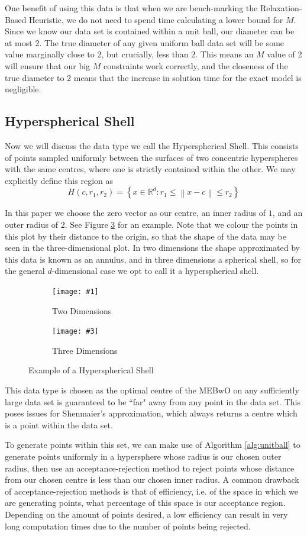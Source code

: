 \documentclass[11pt,twoside]{report}
\newcommand{\norm}[1]{\left\lVert#1\right\rVert} %
\newcommand{\pairfigure}[6]{
    \begin{figure}[ht]
        \centering
        \begin{subfigure}[b]{0.475\textwidth}
            \centering
            \texttt{[image: \#1]}
            \caption{#2}
            \label{#6_#2}
        \end{subfigure}
        \hfill
        \begin{subfigure}[b]{0.475\textwidth}
            \centering
            \texttt{[image: \#3]}
            \caption{#4}
            \label{#6_#4}
        \end{subfigure}
        \caption{#5}
        \label{#6}
\end{figure}
}
\newcommand{\datafigure}[3]{
    \pairfigure{data_plots/#1_2d.png}{Two Dimensions}{data_plots/#1_3d.png}{Three Dimensions}{#2}{#3}
}
\theoremstyle{definition}
\numberwithin{theorem}{section}
\numberwithin{definition}{section}
\numberwithin{lemma}{section}
\numberwithin{proposition}{section}
\numberwithin{equation}{section}
\numberwithin{figure}{section}
\begin{document}
One benefit of using this data is that when we are bench-marking the Relaxation-Based Heuristic, we do not need to spend time calculating a lower bound for $M$. Since we know our data set is contained within a unit ball, our diameter can be at most 2. The true diameter of any given uniform ball data set will be some value marginally close to 2, but crucially, less than 2. This means an $M$ value of 2 will ensure that our big $M$ constraints work correctly, and the closeness of the true diameter to 2 means that the increase in solution time for the exact model is negligible.

\subsection{Hyperspherical Shell}
Now we will discuss the data type we call the Hyperspherical Shell. This consists of points sampled uniformly between the surfaces of two concentric hyperspheres with the same centres, where one is strictly contained within the other. We may explicitly define this region as
\begin{equation*}
    H(c,r_1,r_2) = \left\{x\in\mathbb{R}^d: r_1 \leq \norm{x-c} \leq r_2\right\}
\end{equation*}

In this paper we choose the zero vector as our centre, an inner radius of $1$, and an outer radius of $2$. See Figure \ref{fig:hypshell} for an example. Note that we colour the points in this plot by their distance to the origin, so that the shape of the data may be seen in the three-dimensional plot. In two dimensions the shape approximated by this data is known as an annulus, and in three dimensions a spherical shell, so for the general $d$-dimensional case we opt to call it a hyperspherical shell.

\datafigure{hyperspherical_shell}{Example of a Hyperspherical Shell}{fig:hypshell}

This data type is chosen as the optimal centre of the MEBwO on any sufficiently large data set is guaranteed to be ``far" away from any point in the data set. This poses issues for Shenmaier's approximation, which always returns a centre which is a point within the data set.

To generate points within this set, we can make use of Algorithm \ref{alg:unitball} to generate points uniformly in a hypersphere whose radius is our chosen outer radius, then use an acceptance-rejection method to reject points whose distance from our chosen centre is less than our chosen inner radius. A common drawback of acceptance-rejection methods is that of efficiency, i.e. of the space in which we are generating points, what percentage of this space is our acceptance region. Depending on the amount of points desired, a low efficiency can result in very long computation times due to the number of points being rejected.
\end{document}
